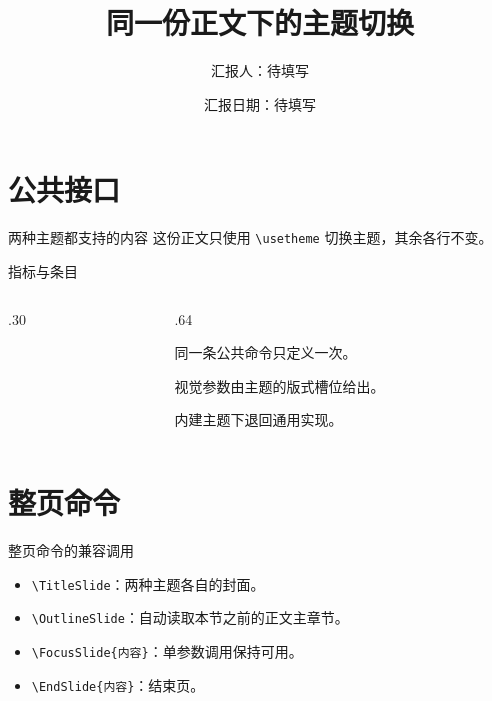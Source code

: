 \documentclass[aspectratio=169]{ctexbeamer}
\title[同一份正文]{同一份正文下的主题切换}
\author{汇报人：待填写}
\institute{哈尔滨工业大学}
\date{汇报日期：待填写}
\begin{document}
\TitleSlide
\OutlineSlide

\section{公共接口}

\begin{frame}{两种主题都支持的内容}
  这份正文只使用 \texttt{\textbackslash usetheme} 切换主题，其余各行不变。

\end{frame}

\begin{frame}{指标与条目}
  \begin{columns}[T,onlytextwidth]
    \begin{column}{.30\textwidth}
    \end{column}
    \begin{column}{.64\textwidth}
      \begin{denseitems}
        \item 同一条公共命令只定义一次。
        \item 视觉参数由主题的版式槽位给出。
        \item 内建主题下退回通用实现。
      \end{denseitems}
    \end{column}
  \end{columns}
\end{frame}

\section{整页命令}

\begin{frame}{整页命令的兼容调用}
  \begin{itemize}
    \item \texttt{\textbackslash TitleSlide}：两种主题各自的封面。
    \item \texttt{\textbackslash OutlineSlide}：自动读取本节之前的正文主章节。
    \item \texttt{\textbackslash FocusSlide\{内容\}}：单参数调用保持可用。
    \item \texttt{\textbackslash EndSlide\{内容\}}：结束页。
  \end{itemize}
\end{frame}


\end{document}
